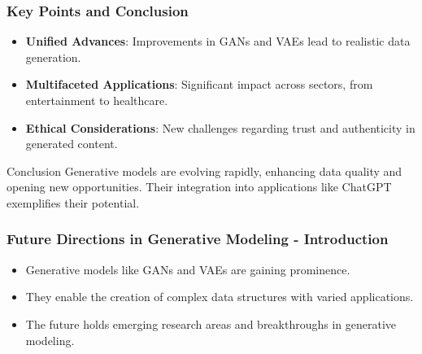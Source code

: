\documentclass[aspectratio=169]{beamer}
\begin{document}
\begin{frame}[fragile]
    \frametitle{Key Points and Conclusion}
    \begin{itemize}
        \item \textbf{Unified Advances}: 
        Improvements in GANs and VAEs lead to realistic data generation.
        \item \textbf{Multifaceted Applications}: 
        Significant impact across sectors, from entertainment to healthcare.
        \item \textbf{Ethical Considerations}: 
        New challenges regarding trust and authenticity in generated content.
    \end{itemize}
    \begin{block}{Conclusion}
        Generative models are evolving rapidly, enhancing data quality and opening new opportunities. Their integration into applications like ChatGPT exemplifies their potential.
    \end{block}
\end{frame}

\begin{frame}[fragile]
    \frametitle{Future Directions in Generative Modeling - Introduction}
    \begin{itemize}
        \item Generative models like GANs and VAEs are gaining prominence.
        \item They enable the creation of complex data structures with varied applications.
        \item The future holds emerging research areas and breakthroughs in generative modeling.
    \end{itemize}
\end{frame}
\end{document}
